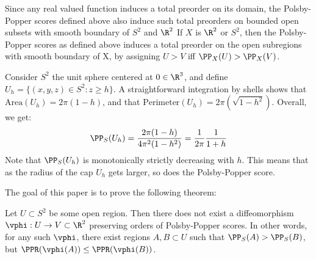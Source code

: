 
Since any real valued function induces a total preorder on its 
domain, the Polsby-Popper scores defined above also induce such 
total preorders on bounded open subsets with smooth boundary of $S^2$ 
and $\R^2$
  If $X$ is $\R^2$ or $S^2$, then the Polsby-Popper scores as 
  defined above induces a total preorder 
  on the open subregions with smooth boundary of X, by assigning $U > V$ iff $\PP_X(U) > \PP_X(V)$. 

\begin{Example}\label{Caps_Eg} 
  Consider $S^2$ the unit sphere centered at $0\in \R^3$, and 
  define $U_h = \{(x,y,z)\in S^2: z\ge h\}$.   A 
  straightforward integration by shells shows that 
  $\mathrm{Area}(U_h) = 2\pi(1-h)$, and that 
  $\mathrm{Perimeter}(U_h)=2\pi(\sqrt{1-h^2})$. Overall, 
  we get:
  \begin{align*}
    \PP_S(U_h) = \frac{2\pi(1-h)}{4\pi^2(1-h^2)}
    =\frac{1}{2\pi}\frac{1}{1+h}
  \end{align*}
  Note that $\PP_S(U_h)$ is monotonically strictly 
  decreasing with $h$. This means that 
  as the radius of the cap $U_h$ 
  gets larger, so does the Polsby-Popper score.
\end{Example}
The goal of this paper is to prove the following theorem:
\begin{Theorem} \label{Thm1}
  Let $U\subset S^2$ be some open region. Then there does 
  not exist a diffeomorphism $\vphi:U\to V\subset \R^2$ 
  preserving orders of Polsby-Popper scores. In other words, 
  for any such $\vphi$, there exist regions $A,B\subset U$ 
  such that $\PP_S(A)>\PP_S(B)$, but 
  $\PPR(\vphi(A))\le \PPR(\vphi(B))$.
\end{Theorem}

